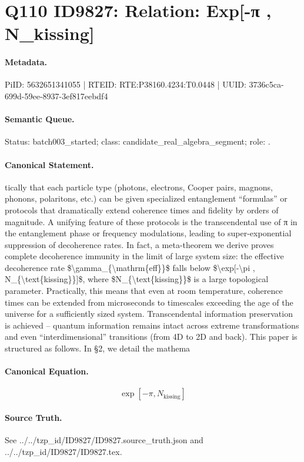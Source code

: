 \section*{Q110 ID9827: Relation: Exp[-π , N\_kissing]}
\paragraph{Metadata.}
PiID: 5632651341055 | RTEID: RTE:P38160.4234:T0.0448 | UUID: 3736c5ca-699d-59ee-8937-3ef817eebdf4

\paragraph{Semantic Queue.}
Status: batch003\_started; class: candidate\_real\_algebra\_segment; role: .

\paragraph{Canonical Statement.}
tically that each particle type (photons, electrons, Cooper pairs, magnons, phonons, polaritons, etc.) can be given specialized entanglement “formulas” or protocols that dramatically extend coherence times and fidelity by orders of magnitude. A unifying feature of these protocols is the transcendental use of π in the entanglement phase or frequency modulations, leading to super-exponential suppression of decoherence rates. In fact, a meta-theorem we derive proves complete decoherence immunity in the limit of large system size: the effective decoherence rate \$\textbackslash{}gamma\_\{\textbackslash{}mathrm\{eff\}\}\$ falls below \$\textbackslash{}exp[-\textbackslash{}pi , N\_\{\textbackslash{}text\{kissing\}\}]\$, where \$N\_\{\textbackslash{}text\{kissing\}\}\$ is a large topological parameter. Practically, this means that even at room temperature, coherence times can be extended from microseconds to timescales exceeding the age of the universe for a sufficiently sized system. Transcendental information preservation is achieved – quantum information remains intact across extreme transformations and even “interdimensional” transitions (from 4D to 2D and back). This paper is structured as follows. In §2, we detail the mathema

\paragraph{Canonical Equation.}
\[
\exp[-\pi , N_{\text{kissing}}]
\]

\paragraph{Source Truth.}
See ../../tzp\_id/ID9827/ID9827.source\_truth.json and ../../tzp\_id/ID9827/ID9827.tex.
